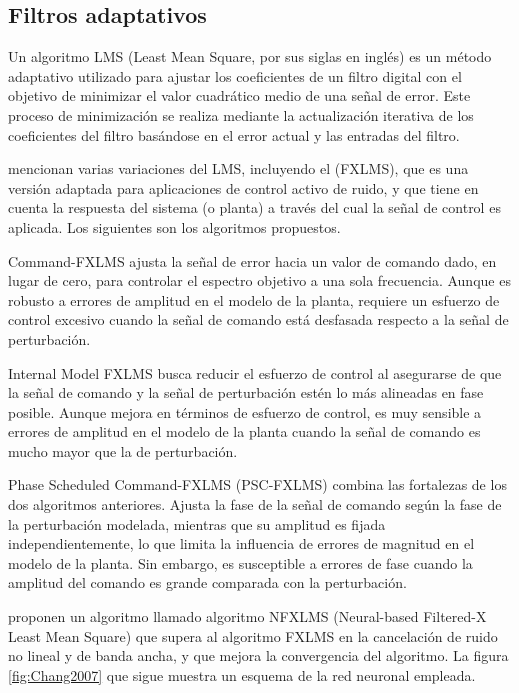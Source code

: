 \documentclass[a4paper,12pt]{article}
\begin{document}
\subsection{Filtros adaptativos}

Un algoritmo LMS (Least Mean Square, por sus siglas en inglés) es un método adaptativo utilizado para ajustar los coeficientes de un filtro digital con el objetivo de minimizar el valor cuadrático medio de una señal de error.
Este proceso de minimización se realiza mediante la actualización iterativa de los coeficientes del filtro basándose en el error actual y las entradas del filtro.

\textcite{Rees2006} mencionan varias variaciones del LMS, incluyendo el  (FXLMS), que es una versión adaptada para aplicaciones de control activo de ruido, y que tiene en cuenta la respuesta del sistema (o planta) a través del cual la señal de control es aplicada.
Los siguientes son los algoritmos propuestos.

Command-FXLMS ajusta la señal de error hacia un valor de comando dado, en lugar de cero, para controlar el espectro objetivo a una sola frecuencia.
Aunque es robusto a errores de amplitud en el modelo de la planta, requiere un esfuerzo de control excesivo cuando la señal de comando está desfasada respecto a la señal de perturbación.

Internal Model FXLMS busca reducir el esfuerzo de control al asegurarse de que la señal de comando y la señal de perturbación estén lo más alineadas en fase posible.
Aunque mejora en términos de esfuerzo de control, es muy sensible a errores de amplitud en el modelo de la planta cuando la señal de comando es mucho mayor que la de perturbación.

Phase Scheduled Command-FXLMS (PSC-FXLMS) combina las fortalezas de los dos algoritmos anteriores.
Ajusta la fase de la señal de comando según la fase de la perturbación modelada, mientras que su amplitud es fijada independientemente, lo que limita la influencia de errores de magnitud en el modelo de la planta.
Sin embargo, es susceptible a errores de fase cuando la amplitud del comando es grande comparada con la perturbación.

\textcite{Chang2007} proponen un algoritmo llamado algoritmo NFXLMS (Neural-based Filtered-X Least Mean Square) que supera al algoritmo FXLMS en la cancelación de ruido no lineal y de banda ancha, y que mejora la convergencia del algoritmo.
La figura \ref{fig:Chang2007} que sigue muestra un esquema de la red neuronal empleada.
\end{document}
